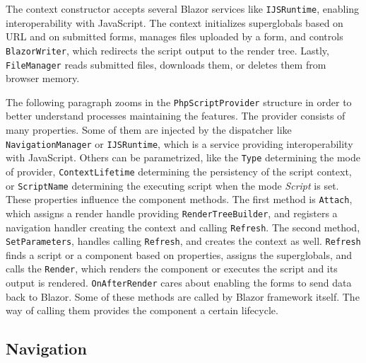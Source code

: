 The context constructor accepts several Blazor services like \texttt{IJSRuntime}, enabling interoperability with JavaScript.
The context initializes superglobals based on URL and on submitted forms, manages files uploaded by a form, and controls \texttt{BlazorWriter}, which redirects the script output to the render tree.
Lastly, \texttt{FileManager} reads submitted files, downloads them, or deletes them from browser memory.
\par
The following paragraph zooms in the \texttt{PhpScriptProvider} structure in order to better understand processes maintaining the features.
The provider consists of many properties.
Some of them are injected by the dispatcher like \texttt{NavigationManager} or \texttt{IJSRuntime}, which is a service providing interoperability with JavaScript.
Others can be parametrized, like the \texttt{Type} determining the mode of provider, \texttt{ContextLifetime} determining the persistency of the script context, or \texttt{ScriptName} determining the executing script when the mode \textit{Script} is set.
These properties influence the component methods.
The first method is \texttt{Attach}, which assigns a render handle providing \texttt{RenderTreeBuilder}, and registers a navigation handler creating the context and calling \texttt{Refresh}.
The second method, \texttt{SetParameters}, handles calling \texttt{Refresh}, and creates the context as well.
\texttt{Refresh} finds a script or a component based on properties, assigns the superglobals, and calls the \texttt{Render}, which renders the component or executes the script and its output is rendered.
\texttt{OnAfterRender} cares about enabling the forms to send data back to Blazor.
Some of these methods are called by Blazor framework itself. The way of calling them provides the component a certain lifecycle.

\subsection{Navigation}

